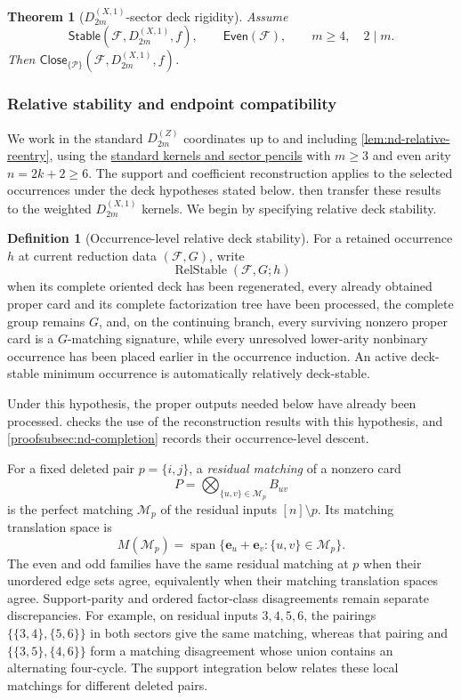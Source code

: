 \documentclass[11pt,letterpaper,onecolumn]{article}
\theoremstyle{plain}
\newtheorem{theorem}{Theorem}[section]
\theoremstyle{definition}
\newtheorem{definition}[definition]{Definition}
\theoremstyle{remark}
\newcommand{\cF}{\mathcal F}
\newcommand{\cP}{\mathscr P}
\newcommand{\DihZ}[1]{{D_{#1}^{(Z)}}}
\newcommand{\DihXone}[1]{{D_{#1}^{(X,1)}}}
\newcommand{\Stable}{\mathsf{Stable}}
\newcommand{\Even}{\mathsf{Even}}
\newcommand{\Close}{\mathsf{Close}}
\newcommand{\Span}{\operatorname{span}}
\begin{document}
\begin{theorem}[\(\DihXone{2m}\)-sector deck rigidity]
\label{thm:marked-A-rigidity}
Assume
\[
 \Stable(\cF,\DihXone{2m},f),\qquad \Even(\cF),
 \qquad m\ge4,\quad 2\mid m.
\]
Then \(\Close_{\{\cP\}}(\cF,\DihXone{2m},f)\).
\end{theorem}

\subsubsection{Relative stability and endpoint compatibility}
\label{subsubsec:nd-relative-endpoints}

We work in the standard \(\DihZ{2m}\) coordinates up to and including
\cref{lem:nd-relative-reentry}, using the
\hyperlink{eq:nd-sector-pencils}{standard kernels and sector pencils}
with \(m\ge3\) and even arity \(n=2k+2\ge6\). The support and coefficient
reconstruction applies to the selected occurrences under the deck hypotheses
stated below. 
then transfer these results to the weighted \(\DihXone{2m}\) kernels.
We begin by specifying relative deck stability.

\begin{definition}[Occurrence-level relative deck stability]
\label{def:occurrence-relative-deck-stability}
For a retained occurrence \(h\) at current reduction data \((\cF,G)\), write
\[
 \operatorname{RelStable}(\cF,G;h)
\]
when its complete oriented deck has been regenerated,
every already obtained proper card and its complete factorization tree
have been processed, the complete group remains \(G\), and, on the continuing branch,
every surviving nonzero proper card is a \(G\)-matching signature, while every
unresolved lower-arity nonbinary occurrence has been placed earlier in the
occurrence induction.  An active deck-stable minimum occurrence is
automatically relatively deck-stable.
\end{definition}

Under this hypothesis, the proper outputs needed below have already
been processed.  checks the use of the
reconstruction results with this hypothesis, and
\cref{proofsubsec:nd-completion} records their occurrence-level descent.

For a fixed deleted pair \(p=\{i,j\}\), a \emph{residual matching} of a
nonzero card
\[
 P=\bigotimes_{\{u,v\}\in\mathcal M_p}B_{uv}
\]
is the perfect matching \(\mathcal M_p\) of the residual inputs
\([n]\setminus p\).  Its matching translation space is
\[
 M(\mathcal M_p)=
 \Span\{{\mathbf{e}}_u+{\mathbf{e}}_v:\{u,v\}\in\mathcal M_p\}.
\]
The even and odd families have the same residual matching at \(p\)
when their unordered edge sets agree, equivalently when their matching
translation spaces agree.
Support-parity and ordered factor-class disagreements remain separate
discrepancies.  For example, on residual inputs \(3,4,5,6\), the pairings
\(\{\{3,4\},\{5,6\}\}\) in both sectors give the same matching, whereas that
pairing and \(\{\{3,5\},\{4,6\}\}\) form a matching disagreement whose
union contains an alternating four-cycle.  The support integration below relates these local matchings for
different deleted pairs.
\end{document}

